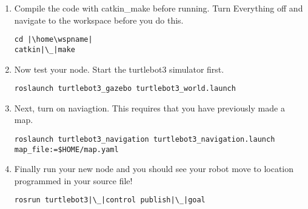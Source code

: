 \documentclass[12pt]{article}
\newcommand{\wspname}{<workspace\_name>}
\newcommand{\nodname}{<node\_name>}
\newcommand{\home}{\textasciitilde/}
\begin{document}
\begin{enumerate}
\vspace{5mm}Add the following lines to the bottom of the file. \\
\underline{\hspace{155mm}}\\\\
{\selectfont add\_executable(\nodname\hspace{3mm}src/\nodname.cpp) } \\
{\selectfont target\_link\_libraries(\nodname \hspace{3mm}\$\{catkin\_LIBRARIES\}) } \vspace{2mm}\\
\underline{\hspace{155mm}}\\\\


     \item Compile the code with catkin\_make before running. Turn Everything off and navigate to the workspace before you do this.\\
\begin{verbatim}
cd |\home\wspname|
catkin|\_|make
\end{verbatim}

    \item Now test your node. Start the turtlebot3 simulator first. 
 
\begin{verbatim}
roslaunch turtlebot3_gazebo turtlebot3_world.launch
\end{verbatim}

 \item Next, turn on naviagtion. This requires that you have previously made a map.
\begin{verbatim}
roslaunch turtlebot3_navigation turtlebot3_navigation.launch map_file:=$HOME/map.yaml
\end{verbatim}

\item Finally run your new node and you should see your robot move to location programmed in your source file!

\begin{verbatim}
rosrun turtlebot3|\_|control publish|\_|goal
\end{verbatim}


\end{enumerate}
\end{document}
